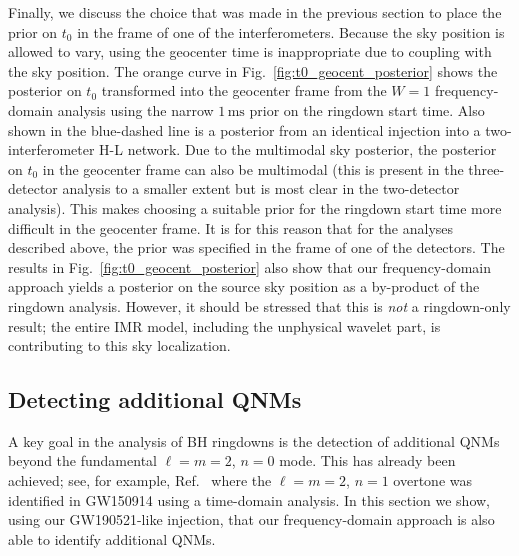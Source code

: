 Finally, we discuss the choice that was made in the previous section to place the prior on $t_0$ in the frame of one of the interferometers.
Because the sky position is allowed to vary, using the geocenter time is inappropriate due to coupling with the sky position.
The orange curve in Fig.~\ref{fig:t0_geocent_posterior} shows the posterior on $t_0$ transformed into the geocenter frame from the $W=1$ frequency-domain analysis using the narrow $1\,\mathrm{ms}$ prior on the ringdown start time. 
Also shown in the blue-dashed line is a posterior from an identical injection into a two-interferometer H-L network.
Due to the multimodal sky posterior, the posterior on $t_0$ in the geocenter frame can also be multimodal (this is present in the three-detector analysis to a smaller extent but is most clear in the two-detector analysis).
This makes choosing a suitable prior for the ringdown start time more difficult in the geocenter frame.
It is for this reason that for the analyses described above, the prior was specified in the frame of one of the detectors.
The results in Fig.~\ref{fig:t0_geocent_posterior} also show that our frequency-domain approach yields a posterior on the source sky position as a by-product of the ringdown analysis. However, it should be stressed that this is \emph{not} a ringdown-only result; the entire IMR model, including the unphysical wavelet part, is contributing to this sky localization.


\subsection{Detecting additional QNMs}\label{subsec:overtones}

A key goal in the analysis of BH ringdowns is the detection of additional QNMs beyond the fundamental $\ell=m=2$, $n=0$ mode.
This has already been achieved; see, for example, Ref.~\cite{Isi:2019aib} where the $\ell=m=2$, $n=1$ overtone was identified in GW150914 using a time-domain analysis.
In this section we show, using our GW190521-like injection, that our frequency-domain approach is also able to identify additional QNMs.

